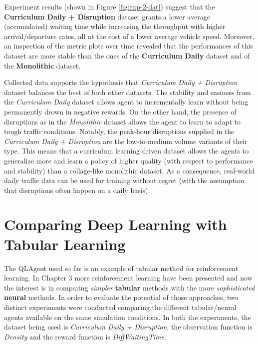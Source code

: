 Experiment results (shown in Figure \ref{fig:exp-2-dat}) suggest that the \textbf{Curriculum Daily + Disruption} dataset grants a lower average (accumulated) waiting time while increasing the throughput with higher arrival/departure rates, all at the cost of a lower average vehicle speed. Moreover, an inspection of the metric plots over time revealed that the performances of this dataset are more stable than the ones of the \textbf{Curriculum Daily} dataset and of the \textbf{Monolithic} dataset.

Collected data supports the hypothesis that \textit{Curriculum Daily + Disruption} dataset balances the best of both other datasets.
The stability and easiness from the \textit{Curriculum Daily} dataset allows agent to incrementally learn without being permanently drown in negative rewards.
On the other hand, the presence of disruptions as in the \textit{Monolithic} dataset allows the agent to learn to adapt to tough traffic conditions.
Notably, the peak-hour disruptions supplied in the \textit{Curriculum Daily + Disruption} are the low-to-medium volume variants of their type.
This means that a curriculum learning driven dataset allows the agents to generalize more and learn a policy of higher quality (with respect to performance and stability) than a collage-like monolithic dataset.
As a consequence, real-world daily traffic data can be used for training without regret (with the assumption that disruptions often happen on a daily basis).



\section{Comparing Deep Learning with Tabular Learning}

The QLAgent used so far is an example of tabular method for reinforcement learning.
In Chapter 3 more reinforcement learning have been presented and now the interest is in comparing \textit{simpler} \textbf{tabular} methods with the more \textit{sophisticated} \textbf{neural} methods.
In order to evaluate the potential of those approaches, two distinct experiments were conducted comparing the different tabular/neural agents available on the same simulation conditions.
In both the experiments, the dataset being used is \textit{Curriculum Daily + Disruption}, the observation function is \textit{Density} and the reward function is \textit{DiffWaitingTime}.


